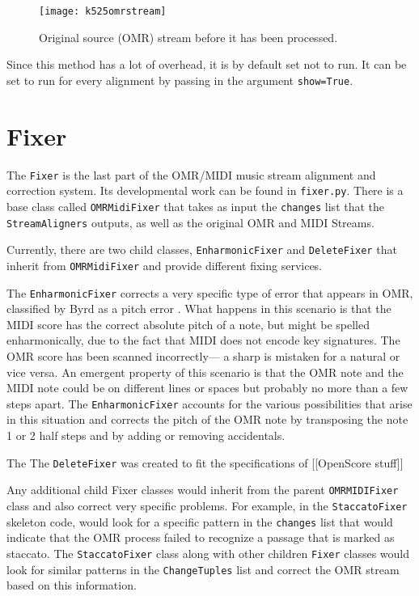 \begin{figure}[!ht]
\centering
\texttt{[image: k525omrstream]}
\caption{Original source (OMR) stream before it has been processed.}
\end{figure}

Since this method has a lot of overhead, it is by default set not to run. It can be set to run for every alignment by passing in the argument \texttt{show=True}. 

\section{Fixer} \label{fixer}
The \texttt{Fixer} is the last part of the OMR/MIDI music stream alignment and correction system. Its developmental work can be found in \texttt{fixer.py}. There is a base class called \texttt{OMRMidiFixer} that takes as input the \texttt{changes} list that the \texttt{StreamAligners} outputs, as well as the original OMR and MIDI Streams.

Currently, there are two child classes, \texttt{EnharmonicFixer} and \texttt{DeleteFixer} that inherit from \texttt{OMRMidiFixer} and provide different fixing services. 

The \texttt{EnharmonicFixer} corrects a very specific type of error that appears in OMR, classified by Byrd as a pitch error \cite{byrd-testbed}. What happens in this scenario is that the MIDI score has the correct absolute pitch of a note, but might be spelled enharmonically, due to the fact that MIDI does not encode key signatures. The OMR score has been scanned incorrectly--- a sharp is mistaken for a natural or vice versa. An emergent property of this scenario is that the OMR note and the MIDI note could be on different lines or spaces but probably no more than a few steps apart. The \texttt{EnharmonicFixer} accounts for the various possibilities that arise in this situation and corrects the pitch of the OMR note by transposing the note 1 or 2 half steps and by adding or removing accidentals.

The The \texttt{DeleteFixer} was created to fit the specifications of [[OpenScore stuff]]

Any additional child Fixer classes would inherit from the parent \texttt{OMRMIDIFixer} class and also correct very specific problems. For example, in the \texttt{StaccatoFixer} skeleton code, would look for a specific pattern in the \texttt{changes} list that would indicate that the OMR process failed to recognize a passage that is marked as staccato. The \texttt{StaccatoFixer} class along with other children \texttt{Fixer} classes would look for similar patterns in the \texttt{ChangeTuples} list and correct the OMR stream based on this information. 

